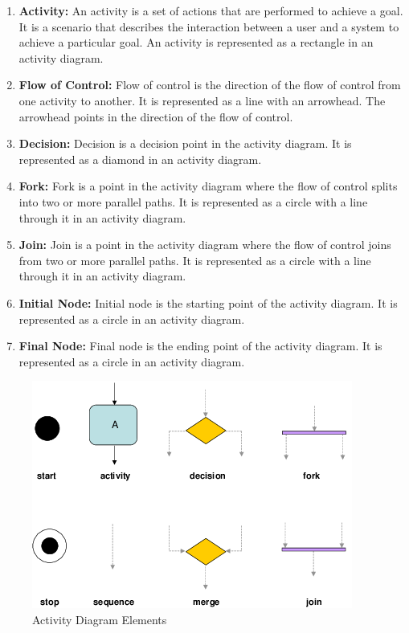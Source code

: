 \documentclass[11pt]{article}
\begin{document}
\begin{enumerate}
	\item \textbf{Activity:} An activity is a set of actions that are performed to achieve a goal. It is a scenario that describes the interaction between a user and a system to achieve a particular goal. An activity is represented as a rectangle in an activity diagram.
	\item \textbf{Flow of Control:} Flow of control is the direction of the flow of control from one activity to another. It is represented as a line with an arrowhead. The arrowhead points in the direction of the flow of control.
	\item \textbf{Decision:} Decision is a decision point in the activity diagram. It is represented as a diamond in an activity diagram.
	\item \textbf{Fork:} Fork is a point in the activity diagram where the flow of control splits into two or more parallel paths. It is represented as a circle with a line through it in an activity diagram.
	\item \textbf{Join:} Join is a point in the activity diagram where the flow of control joins from two or more parallel paths. It is represented as a circle with a line through it in an activity diagram.
	\item \textbf{Initial Node:} Initial node is the starting point of the activity diagram. It is represented as a circle in an activity diagram.
	\item \textbf{Final Node:} Final node is the ending point of the activity diagram. It is represented as a circle in an activity diagram.
\end{enumerate}

\begin{figure}[H]
	\centering
	\includegraphics[width=.8\textwidth]{UML-Activity-Diagram-elements.png}
	\caption{Activity Diagram Elements}
\end{figure}
\end{document}
